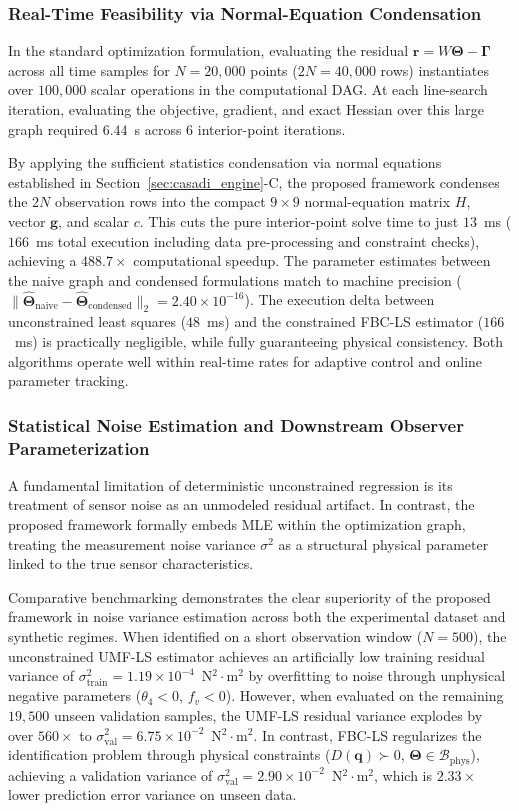 \documentclass[lettersize,journal]{IEEEtran}
\begin{document}
\subsubsection{Real-Time Feasibility via Normal-Equation Condensation}
In the standard optimization formulation, evaluating the residual $\bm{r} = W \bm{\Theta} - \bm{\Gamma}$ across all time samples for $N = 20,000$ points ($2N = 40,000$ rows) instantiates over $100,000$ scalar operations in the computational DAG. At each line-search iteration, evaluating the objective, gradient, and exact Hessian over this large graph required $6.44$~s across 6 interior-point iterations.

By applying the sufficient statistics condensation via normal equations established in Section~\ref{sec:casadi_engine}-C, the proposed framework condenses the $2N$ observation rows into the compact $9 \times 9$ normal-equation matrix $H$, vector $\bm{g}$, and scalar $c$. This cuts the pure interior-point solve time to just $13$~ms ($166$~ms total execution including data pre-processing and constraint checks), achieving a $488.7\times$ computational speedup. The parameter estimates between the naive graph and condensed formulations match to machine precision ($\| \hat{\bm{\Theta}}_{\text{naive}} - \hat{\bm{\Theta}}_{\text{condensed}} \|_2 = 2.40 \times 10^{-16}$). The execution delta between unconstrained least squares ($48$~ms) and the constrained FBC-LS estimator ($166$~ms) is practically negligible, while fully guaranteeing physical consistency. Both algorithms operate well within real-time rates for adaptive control and online parameter tracking.

\subsubsection{Statistical Noise Estimation and Downstream Observer Parameterization}
A fundamental limitation of deterministic unconstrained regression is its treatment of sensor noise as an unmodeled residual artifact. In contrast, the proposed framework formally embeds MLE within the optimization graph, treating the measurement noise variance $\sigma^2$ as a structural physical parameter linked to the true sensor characteristics.

Comparative benchmarking demonstrates the clear superiority of the proposed framework in noise variance estimation across both the experimental dataset and synthetic regimes. When identified on a short observation window ($N = 500$), the unconstrained UMF-LS estimator achieves an artificially low training residual variance of $\sigma^2_{\text{train}} = 1.19 \times 10^{-4}$~N$^2\cdot$m$^2$ by overfitting to noise through unphysical negative parameters ($\theta_4 < 0$, $f_{v} < 0$). However, when evaluated on the remaining $19,500$ unseen validation samples, the UMF-LS residual variance explodes by over $560\times$ to $\sigma^2_{\text{val}} = 6.75 \times 10^{-2}$~N$^2\cdot$m$^2$. In contrast, FBC-LS regularizes the identification problem through physical constraints ($D(\bm{q}) \succ 0$, $\bm{\Theta} \in \mathcal{B}_{\mathrm{phys}}$), achieving a validation variance of $\sigma^2_{\text{val}} = 2.90 \times 10^{-2}$~N$^2\cdot$m$^2$, which is $2.33\times$ lower prediction error variance on unseen data.
\end{document}
